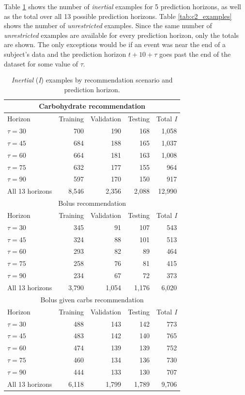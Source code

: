 \documentclass[graybox]{svmult}
\begin{document}
Table \ref{tab:c1_examples} shows the number of {\it inertial} examples for 5 prediction horizons, as well as the total over all 13 possible prediction horizons. Table \ref{tab:c2_examples} shows the number of {\it unrestricted} examples. Since the same number of {\it unrestricted}  examples are available for every prediction horizon, only the totals are shown. The only exceptions would be if an event was near the end of a subject's data and the prediction horizon $t+10+\tau$ goes past the end of the dataset for some value of $\tau$.

\begin{table}\setlength{\tabcolsep}{4pt}
\begin{center}
\caption{{\it Inertial} ({\it I}) examples by recommendation scenario and prediction horizon.}
\label{tab:c1_examples}
\begin{tabular}{|l|rrrr|}

    \hline
    \multicolumn{5}{|c|}{Carbohydrate recommendation}\\
    \hline
    Horizon & Training & Validation & Testing & Total {\it I}\\
    \hline
    $\tau=30$ & 700 & 190 & 168 & 1,058\\
    $\tau=45$ & 684 & 188 & 165 & 1,037\\ 
    $\tau=60$ & 664 & 181 & 163 & 1,008\\
    $\tau=75$ & 632 & 177 & 155 & 964\\ 
    $\tau=90$ & 597 & 170 & 150 & 917\\
    All 13 horizons & 8,546 & 2,356 & 2,088 & 12,990\\
    \hline
    \hline
    \multicolumn{5}{|c|}{Bolus recommendation}\\
    \hline
    Horizon & Training & Validation & Testing & Total {\it I}\\
    \hline
    $\tau=30$ & 345 & 91 & 107 & 543\\
    $\tau=45$ & 324 & 88 & 101 & 513\\ 
    $\tau=60$ & 293 & 82 & 89 & 464\\
    $\tau=75$ & 258 & 76 & 81 & 415\\ 
    $\tau=90$ & 234 & 67 & 72 & 373\\
    All 13 horizons & 3,790 & 1,054 & 1,176 & 6,020\\
    \hline
    \hline
    \multicolumn{5}{|c|}{Bolus given carbs recommendation}\\
    \hline
    Horizon & Training & Validation & Testing & Total {\it I}\\
    \hline
    $\tau=30$ & 488 & 143 & 142 & 773\\
    $\tau=45$ & 483 & 142 & 140 & 765\\ 
    $\tau=60$ & 474 & 139 & 139 & 752\\
    $\tau=75$ & 460 & 134 & 136 & 730\\ 
    $\tau=90$ & 444 & 133 & 130 & 707\\
    All 13 horizons & 6,118 & 1,799 & 1,789 & 9,706\\
    \hline
    

\end{tabular}
\end{center}
\end{table}
\end{document}
